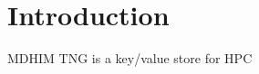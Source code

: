 \hypertarget{index_intro_sec}{}\section{Introduction}\label{index_intro_sec}
M\-D\-H\-I\-M T\-N\-G is a key/value store for H\-P\-C 